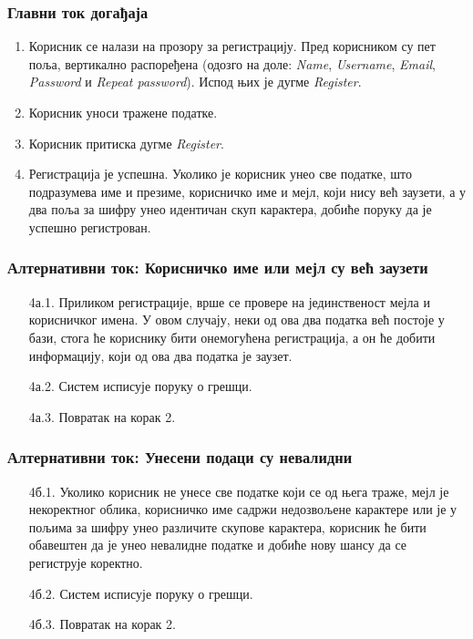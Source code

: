\documentclass[12pt,a4paper]{article}
\begin{document}
   \subsubsection{Главни ток догађаја} 
 \begin{enumerate}
        \item {Корисник се налази на прозору за регистрацију.}\newline
         Пред корисником су пет поља, вертикално распоређена (одозго на доле:  \textit{Name},  \textit{Username},  \textit{Email}, \textit{Password} и  \textit{Repeat password}). Испод њих је дугме \textit{Register}. 
        \item {Корисник уноси тражене податке.}
        \item {Корисник притиска дугме \textit{Register}.}
        \item {Регистрација је успешна.}\newline
            Уколико је корисник унео све податке, што подразумева име и презиме, корисничко име и мејл, који нису већ заузети, а у два поља за шифру унео идентичан скуп карактера, добиће поруку да је успешно регистрован.
\end{enumerate}
\subsubsection {Алтернативни ток: Корисничко име или мејл су већ заузети}
 \begin{enumerate}
    \item[4а.1.] Приликом регистрације, врше се провере на јединственост мејла и корисничког имена. У овом случају, неки од ова два податка већ постоје у бази, стога ће кориснику бити онемогућена регистрација, а он ће добити информацију, који од ова два податка је заузет.
    \item[4а.2.] Систем исписује поруку о грешци. 
    \item[4а.3.] Повратак на корак 2.
    \end{enumerate}
   \subsubsection {Алтернативни ток: Унесени подаци су невалидни}
     \begin{enumerate}
    \item[4б.1.]Уколико корисник не унесе све податке који се од њега траже, мејл је некоректног облика, корисничко име садржи недозвољене карактере или је у пољима за шифру унео различите скупове карактера, корисник ће бити обавештен да је унео невалидне податке и добиће нову шансу да се региструје коректно.
    \item[4б.2.] Систем исписује поруку о грешци. 
    \item[4б.3.] Повратак на корак 2.
    \end{enumerate}
\end{document}
